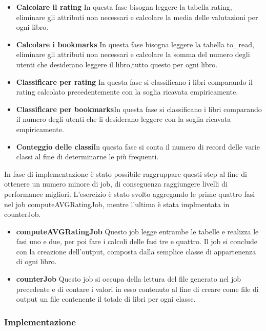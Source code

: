 \begin{itemize}
    \item \textbf{Calcolare il rating} In questa fase bisogna leggere la tabella rating, eliminare gli attributi non necessari
    e calcolare la media delle valutazioni per ogni libro.
    \item \textbf{Calcolare i bookmarks} In questa fase bisogna leggere la tabella to\_read, eliminare gli attributi non necessari
    e calcolare la somma del numero degli utenti che desiderano leggere il libro,tutto questo per ogni libro.
    \item \textbf{Classificare per rating} In questa fase si classificano i libri comparando il rating calcolato
    precedentemente con la soglia ricavata empiricamente.
    \item \textbf{Classificare per bookmarks}In questa fase si classificano i libri comparando il numero degli utenti che li desiderano leggere
    con la soglia ricavata empiricamente.
     \item \textbf{Conteggio delle classi}In questa fase si conta il numero di record delle varie classi al fine di determinarne le più
     frequenti.
\end{itemize}

In fase di implementazione è stato possibile raggruppare questi step al fine di ottenere un numero minore di job, di conseguenza raggiungere
livelli di performance migliori.
L'esercizio è stato svolto aggregando le prime quattro fasi nel job computeAVGRatingJob,
mentre l'ultima è stata implmentata in counterJob.

\begin{itemize}
    \item \textbf{computeAVGRatingJob} Questo job legge entrambe le tabelle e realizza le fasi uno e due, per poi fare i calcoli delle fasi tre e quattro.
    Il job si conclude con la creazione dell'output, composta dalla semplice classe di appartenenza di ogni libro.
    \item \textbf{counterJob} Questo job si occupa della lettura del file generato nel job precedente e di contare i valori in esso contenuto al
    fine di creare come file di output un file contenente il totale di libri per ogni classe.
\end{itemize}

\subsubsection{Implementazione}


